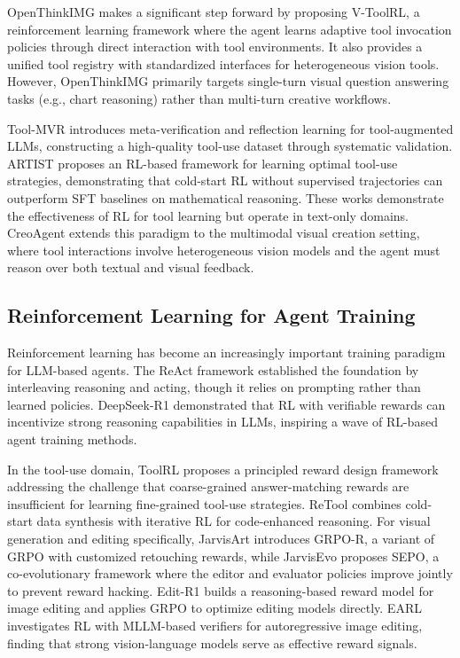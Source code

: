 \documentclass[11pt]{article}
\begin{document}
OpenThinkIMG \cite{su2025openthinkimg} makes a significant step forward by proposing V-ToolRL, a reinforcement learning framework where the agent learns adaptive tool invocation policies through direct interaction with tool environments. It also provides a unified tool registry with standardized interfaces for heterogeneous vision tools. However, OpenThinkIMG primarily targets single-turn visual question answering tasks (e.g., chart reasoning) rather than multi-turn creative workflows.

Tool-MVR \cite{ma2025toolmvr} introduces meta-verification and reflection learning for tool-augmented LLMs, constructing a high-quality tool-use dataset through systematic validation. ARTIST \cite{artist2025} proposes an RL-based framework for learning optimal tool-use strategies, demonstrating that cold-start RL without supervised trajectories can outperform SFT baselines on mathematical reasoning. These works demonstrate the effectiveness of RL for tool learning but operate in text-only domains. CreoAgent extends this paradigm to the multimodal visual creation setting, where tool interactions involve heterogeneous vision models and the agent must reason over both textual and visual feedback.

\subsection{Reinforcement Learning for Agent Training}

Reinforcement learning has become an increasingly important training paradigm for LLM-based agents. The ReAct framework \cite{yao2022react} established the foundation by interleaving reasoning and acting, though it relies on prompting rather than learned policies. DeepSeek-R1 \cite{guo2025deepseekr1} demonstrated that RL with verifiable rewards can incentivize strong reasoning capabilities in LLMs, inspiring a wave of RL-based agent training methods.

In the tool-use domain, ToolRL \cite{toolrl2025} proposes a principled reward design framework addressing the challenge that coarse-grained answer-matching rewards are insufficient for learning fine-grained tool-use strategies. ReTool \cite{retool2025} combines cold-start data synthesis with iterative RL for code-enhanced reasoning. For visual generation and editing specifically, JarvisArt \cite{lin2025jarvisart} introduces GRPO-R, a variant of GRPO with customized retouching rewards, while JarvisEvo \cite{lin2025jarvisevo} proposes SEPO, a co-evolutionary framework where the editor and evaluator policies improve jointly to prevent reward hacking. Edit-R1 \cite{editr1} builds a reasoning-based reward model for image editing and applies GRPO to optimize editing models directly. EARL \cite{earl2025} investigates RL with MLLM-based verifiers for autoregressive image editing, finding that strong vision-language models serve as effective reward signals.
\end{document}
